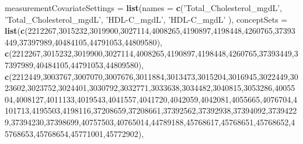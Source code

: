 \documentclass[
]{article}
\newenvironment{Shaded}{\begin{snugshade}}{\end{snugshade}}
\newcommand{\DataTypeTok}[1]{\textcolor[rgb]{0.13,0.29,0.53}{#1}}
\newcommand{\DecValTok}[1]{\textcolor[rgb]{0.00,0.00,0.81}{#1}}
\newcommand{\KeywordTok}[1]{\textcolor[rgb]{0.13,0.29,0.53}{\textbf{#1}}}
\newcommand{\NormalTok}[1]{#1}
\newcommand{\StringTok}[1]{\textcolor[rgb]{0.31,0.60,0.02}{#1}}
\begin{document}
\begin{Shaded}
\begin{Highlighting}[]
                      \DataTypeTok{measurementCovariateSettings =} \KeywordTok{list}\NormalTok{(}\DataTypeTok{names =} \KeywordTok{c}\NormalTok{(}\StringTok{'Total_Cholesterol_mgdL'}\NormalTok{, }\StringTok{'Total_Cholesterol_mgdL'}\NormalTok{,}
                                                                    \StringTok{'HDL-C_mgdL'}\NormalTok{, }\StringTok{'HDL-C_mgdL'}
\NormalTok{                                                                    ),}
                                                          \DataTypeTok{conceptSets =} \KeywordTok{list}\NormalTok{(}\KeywordTok{c}\NormalTok{(}\DecValTok{2212267}\NormalTok{,}\DecValTok{3015232}\NormalTok{,}\DecValTok{3019900}\NormalTok{,}\DecValTok{3027114}\NormalTok{,}\DecValTok{4008265}\NormalTok{,}\DecValTok{4190897}\NormalTok{,}\DecValTok{4198448}\NormalTok{,}\DecValTok{4260765}\NormalTok{,}\DecValTok{37393449}\NormalTok{,}\DecValTok{37397989}\NormalTok{,}\DecValTok{40484105}\NormalTok{,}\DecValTok{44791053}\NormalTok{,}\DecValTok{44809580}\NormalTok{),}
                                                                             \KeywordTok{c}\NormalTok{(}\DecValTok{2212267}\NormalTok{,}\DecValTok{3015232}\NormalTok{,}\DecValTok{3019900}\NormalTok{,}\DecValTok{3027114}\NormalTok{,}\DecValTok{4008265}\NormalTok{,}\DecValTok{4190897}\NormalTok{,}\DecValTok{4198448}\NormalTok{,}\DecValTok{4260765}\NormalTok{,}\DecValTok{37393449}\NormalTok{,}\DecValTok{37397989}\NormalTok{,}\DecValTok{40484105}\NormalTok{,}\DecValTok{44791053}\NormalTok{,}\DecValTok{44809580}\NormalTok{),}
                                                                             \KeywordTok{c}\NormalTok{(}\DecValTok{2212449}\NormalTok{,}\DecValTok{3003767}\NormalTok{,}\DecValTok{3007070}\NormalTok{,}\DecValTok{3007676}\NormalTok{,}\DecValTok{3011884}\NormalTok{,}\DecValTok{3013473}\NormalTok{,}\DecValTok{3015204}\NormalTok{,}\DecValTok{3016945}\NormalTok{,}\DecValTok{3022449}\NormalTok{,}\DecValTok{3023602}\NormalTok{,}\DecValTok{3023752}\NormalTok{,}\DecValTok{3024401}\NormalTok{,}\DecValTok{3030792}\NormalTok{,}\DecValTok{3032771}\NormalTok{,}\DecValTok{3033638}\NormalTok{,}\DecValTok{3034482}\NormalTok{,}\DecValTok{3040815}\NormalTok{,}\DecValTok{3053286}\NormalTok{,}\DecValTok{4005504}\NormalTok{,}\DecValTok{4008127}\NormalTok{,}\DecValTok{4011133}\NormalTok{,}\DecValTok{4019543}\NormalTok{,}\DecValTok{4041557}\NormalTok{,}\DecValTok{4041720}\NormalTok{,}\DecValTok{4042059}\NormalTok{,}\DecValTok{4042081}\NormalTok{,}\DecValTok{4055665}\NormalTok{,}\DecValTok{4076704}\NormalTok{,}\DecValTok{4101713}\NormalTok{,}\DecValTok{4195503}\NormalTok{,}\DecValTok{4198116}\NormalTok{,}\DecValTok{37208659}\NormalTok{,}\DecValTok{37208661}\NormalTok{,}\DecValTok{37392562}\NormalTok{,}\DecValTok{37392938}\NormalTok{,}\DecValTok{37394092}\NormalTok{,}\DecValTok{37394229}\NormalTok{,}\DecValTok{37394230}\NormalTok{,}\DecValTok{37398699}\NormalTok{,}\DecValTok{40757503}\NormalTok{,}\DecValTok{40765014}\NormalTok{,}\DecValTok{44789188}\NormalTok{,}\DecValTok{45768617}\NormalTok{,}\DecValTok{45768651}\NormalTok{,}\DecValTok{45768652}\NormalTok{,}\DecValTok{45768653}\NormalTok{,}\DecValTok{45768654}\NormalTok{,}\DecValTok{45771001}\NormalTok{,}\DecValTok{45772902}\NormalTok{),}

\end{Highlighting}
\end{Shaded}
\end{document}
